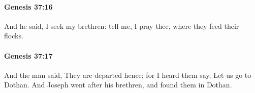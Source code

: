 		\paragraph{Genesis 37:16} %
			\label{GENESIS-37-16}

			And he said, I seek my brethren: tell me, I pray thee, where they feed their flocks.


		\paragraph{Genesis 37:17} %
			\label{GENESIS-37-17}

			And the man said, They are departed hence; for I heard them say, Let us go to Dothan. And Joseph went after his brethren, and found them in Dothan.


